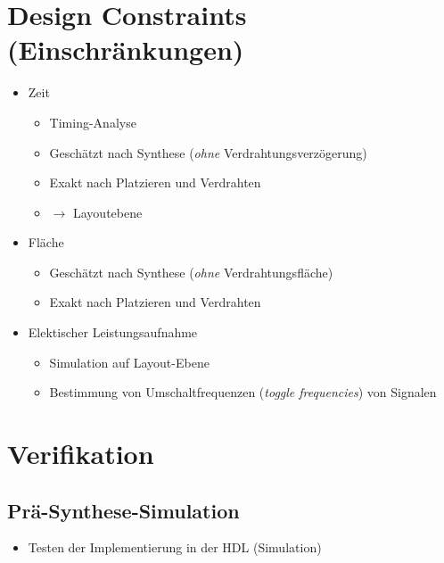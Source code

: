 \documentclass[a4paper, 11pt, accentcolor = tud3b]{tudreport}
\begin{document}
		\section{Design Constraints (Einschränkungen)}
			\begin{itemize}
				\item Zeit
					\begin{itemize}
						\item Timing-Analyse
						\item Geschätzt nach Synthese (\textit{ohne} Verdrahtungsverzögerung)
						\item Exakt nach Platzieren und Verdrahten
						\item $ \rightarrow $ Layoutebene
					\end{itemize}
				\item Fläche
					\begin{itemize}
						\item Geschätzt nach Synthese (\textit{ohne} Verdrahtungsfläche)
						\item Exakt nach Platzieren und Verdrahten
					\end{itemize}
				\item Elektischer Leistungsaufnahme
					\begin{itemize}
						\item Simulation auf Layout-Ebene
						\item Bestimmung von Umschaltfrequenzen (\textit{toggle frequencies}) von Signalen
					\end{itemize}
			\end{itemize}
		
		\section{Verifikation}
			\subsection{Prä-Synthese-Simulation}
				\begin{itemize}
					\item Testen der Implementierung in der HDL (Simulation)
				\end{itemize}
			
\end{document}
